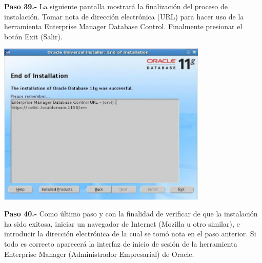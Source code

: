 \begin{enumerate}
\textbf {Paso 39.-} La siguiente pantalla mostrará la finalización del proceso de instalación. Tomar nota de dirección electrónica (URL) para hacer uso de la herramienta Enterprise Manager Database Control. Finalmente presionar el botón Exit (Salir).

\begin{center}
  \includegraphics[width=10cm]{Imagenes/Oracle_Database/Paso_39.png}
\end{center}
\break

\textbf {Paso 40.-} Como último paso y con la finalidad de verificar de que la instalación ha sido exitosa, iniciar un navegador de Internet (Mozilla u otro similar), e introducir la dirección electrónica de la cual se tomó nota en el paso anterior. Si todo es correcto aparecerá la interfaz de inicio de sesión de la herramienta Enterprise Manager (Administrador Empresarial) de Oracle.


\end{enumerate}
